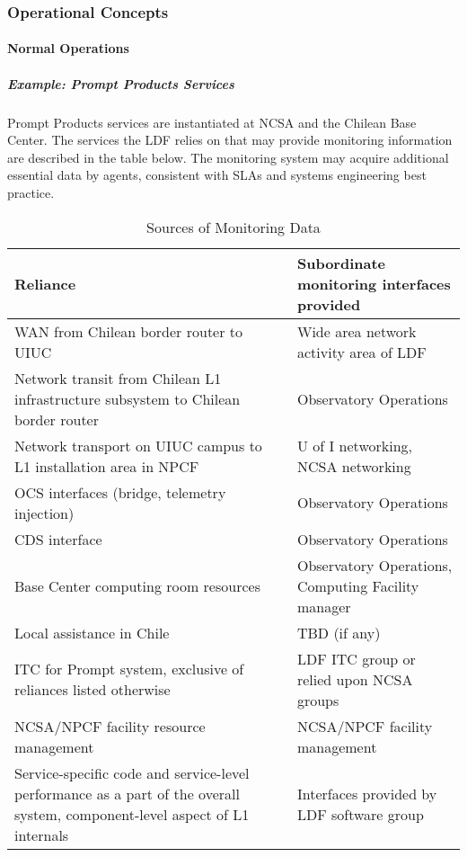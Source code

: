\subsubsection{Operational Concepts}

\paragraph{Normal Operations}

\subparagraph{Example: Prompt Products Services}

Prompt Products services are instantiated at NCSA and the Chilean Base Center. The
services the LDF relies on that may provide monitoring information are described
in the table below. The monitoring system may acquire additional essential data
by agents, consistent with SLAs and systems engineering best practice.

\begin{longtable}{|p{}|p{}|}
\caption{Sources of Monitoring Data} \\\hline
\textbf{Reliance} & \textbf{Subordinate monitoring interfaces provided} \\\hline
WAN from Chilean border router to UIUC & Wide area network activity area of LDF \\\hline
Network transit from Chilean L1 infrastructure subsystem to Chilean border router & Observatory Operations \\\hline
Network transport on UIUC campus to L1 installation area in NPCF & U of I networking, NCSA networking \\\hline
OCS interfaces (bridge, telemetry injection) & Observatory Operations \\\hline
CDS interface & Observatory Operations \\\hline
Base Center computing room resources & Observatory Operations, Computing Facility manager \\\hline
Local assistance in Chile & TBD (if any) \\\hline
ITC for Prompt system, exclusive of reliances listed otherwise & LDF ITC group or relied upon NCSA groups \\\hline
NCSA/NPCF facility resource management & NCSA/NPCF facility management \\\hline
Service-specific code and service-level performance as a part of the overall system, component-level aspect of L1 internals & Interfaces provided by LDF software group \\\hline
\end{longtable}

